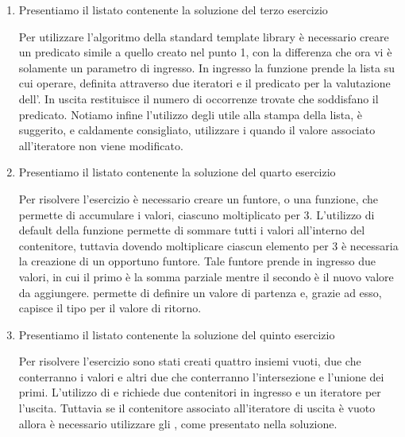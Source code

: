 \begin{enumerate}
	\item Presentiamo il listato contenente la soluzione del terzo esercizio
		\lstset{basicstyle=\scriptsize\sf}
		
		\lstset{basicstyle=\sf}
		Per utilizzare l'algoritmo  della standard template library \`e necessario creare
		un predicato simile a quello creato nel punto 1, con la differenza che ora vi \`e solamente un 
		parametro di ingresso. In ingresso la funzione  prende la lista su cui operare, 
		definita attraverso due iteratori e il predicato per la valutazione dell'. In uscita 
		 restituisce il numero di occorrenze trovate che soddisfano il predicato. Notiamo
		infine l'utilizzo degli  utile alla stampa della lista, \`e suggerito, e 
		caldamente consigliato, utilizzare i  quando il valore associato all'iteratore
		non viene modificato.
		
	\item Presentiamo il listato contenente la soluzione del quarto esercizio
		\lstset{basicstyle=\scriptsize\sf}
		
		\lstset{basicstyle=\sf}
		Per risolvere l'esercizio \`e necessario creare un funtore, o una funzione, che permette di
		accumulare i valori, ciascuno moltiplicato per $3$. L'utilizzo di default della funzione
		 permette di sommare tutti i valori all'interno del contenitore, tuttavia dovendo
		moltiplicare ciascun elemento per $3$ \`e necessaria la creazione di un opportuno funtore. Tale
		funtore prende in ingresso due valori, in cui il primo \`e la somma parziale mentre il secondo
		\`e il nuovo valore da aggiungere.  permette di definire un valore di partenza e,
		grazie ad esso, capisce il tipo per il valore di ritorno. 
		
	\item Presentiamo il listato contenente la soluzione del quinto esercizio							
		\lstset{basicstyle=\scriptsize\sf}
		
		\lstset{basicstyle=\sf}
		Per risolvere l'esercizio sono stati creati quattro insiemi vuoti, due che conterranno i 
		valori e altri due che conterranno l'intersezione e l'unione  dei primi. L'utilizzo di
		 e  richiede due contenitori in ingresso e un iteratore per 
		l'uscita. Tuttavia se il contenitore associato all'iteratore di uscita \`e vuoto allora \`e
		necessario utilizzare gli , come presentato nella soluzione.
		

\end{enumerate}

